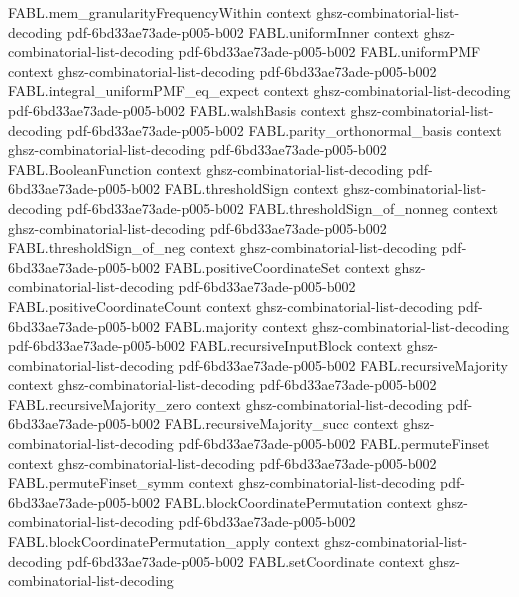 \begin{theorem}
\proofstep
  {FABL.mem_granularityFrequencyWithin}
  {context}
  {ghsz-combinatorial-list-decoding}
  {pdf-6bd33ae73ade-p005-b002}
\proofstep
  {FABL.uniformInner}
  {context}
  {ghsz-combinatorial-list-decoding}
  {pdf-6bd33ae73ade-p005-b002}
\proofstep
  {FABL.uniformPMF}
  {context}
  {ghsz-combinatorial-list-decoding}
  {pdf-6bd33ae73ade-p005-b002}
\proofstep
  {FABL.integral_uniformPMF_eq_expect}
  {context}
  {ghsz-combinatorial-list-decoding}
  {pdf-6bd33ae73ade-p005-b002}
\proofstep
  {FABL.walshBasis}
  {context}
  {ghsz-combinatorial-list-decoding}
  {pdf-6bd33ae73ade-p005-b002}
\proofstep
  {FABL.parity_orthonormal_basis}
  {context}
  {ghsz-combinatorial-list-decoding}
  {pdf-6bd33ae73ade-p005-b002}
\proofstep
  {FABL.BooleanFunction}
  {context}
  {ghsz-combinatorial-list-decoding}
  {pdf-6bd33ae73ade-p005-b002}
\proofstep
  {FABL.thresholdSign}
  {context}
  {ghsz-combinatorial-list-decoding}
  {pdf-6bd33ae73ade-p005-b002}
\proofstep
  {FABL.thresholdSign_of_nonneg}
  {context}
  {ghsz-combinatorial-list-decoding}
  {pdf-6bd33ae73ade-p005-b002}
\proofstep
  {FABL.thresholdSign_of_neg}
  {context}
  {ghsz-combinatorial-list-decoding}
  {pdf-6bd33ae73ade-p005-b002}
\proofstep
  {FABL.positiveCoordinateSet}
  {context}
  {ghsz-combinatorial-list-decoding}
  {pdf-6bd33ae73ade-p005-b002}
\proofstep
  {FABL.positiveCoordinateCount}
  {context}
  {ghsz-combinatorial-list-decoding}
  {pdf-6bd33ae73ade-p005-b002}
\proofstep
  {FABL.majority}
  {context}
  {ghsz-combinatorial-list-decoding}
  {pdf-6bd33ae73ade-p005-b002}
\proofstep
  {FABL.recursiveInputBlock}
  {context}
  {ghsz-combinatorial-list-decoding}
  {pdf-6bd33ae73ade-p005-b002}
\proofstep
  {FABL.recursiveMajority}
  {context}
  {ghsz-combinatorial-list-decoding}
  {pdf-6bd33ae73ade-p005-b002}
\proofstep
  {FABL.recursiveMajority_zero}
  {context}
  {ghsz-combinatorial-list-decoding}
  {pdf-6bd33ae73ade-p005-b002}
\proofstep
  {FABL.recursiveMajority_succ}
  {context}
  {ghsz-combinatorial-list-decoding}
  {pdf-6bd33ae73ade-p005-b002}
\proofstep
  {FABL.permuteFinset}
  {context}
  {ghsz-combinatorial-list-decoding}
  {pdf-6bd33ae73ade-p005-b002}
\proofstep
  {FABL.permuteFinset_symm}
  {context}
  {ghsz-combinatorial-list-decoding}
  {pdf-6bd33ae73ade-p005-b002}
\proofstep
  {FABL.blockCoordinatePermutation}
  {context}
  {ghsz-combinatorial-list-decoding}
  {pdf-6bd33ae73ade-p005-b002}
\proofstep
  {FABL.blockCoordinatePermutation_apply}
  {context}
  {ghsz-combinatorial-list-decoding}
  {pdf-6bd33ae73ade-p005-b002}
\proofstep
  {FABL.setCoordinate}
  {context}
  {ghsz-combinatorial-list-decoding}

\end{theorem}
